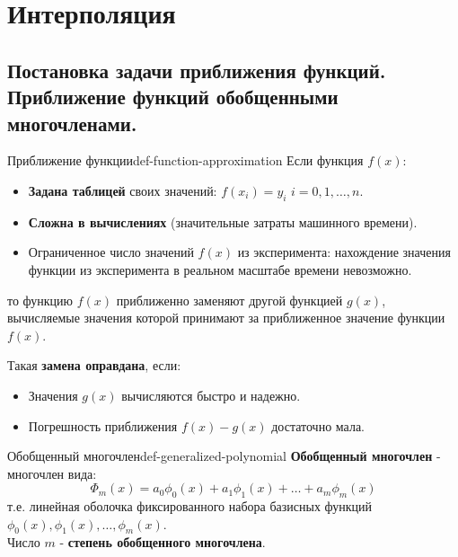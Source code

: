 \documentclass[14pt]{extarticle}
\begin{document}
\section{Интерполяция}

\subsection{Постановка задачи приближения функций. Приближение функций обобщенными многочленами.}

    \begin{definition}{Приближение функции}{def-function-approximation}
        Если функция $f(x)$:
        \begin{itemize}
            \item \textbf{Задана таблицей} своих значений: $f(x_{i}) = y_{i}$ $i = 0, 1, \ldots, n$.
            \item \textbf{Сложна в вычислениях} (значительные затраты машинного времени).
            \item Ограниченное число значений $f(x)$ из эксперимента: нахождение значения функции из эксперимента в реальном масштабе времени невозможно.
        \end{itemize}
        то функцию $f(x)$ приближенно заменяют другой функцией $g(x)$, вычисляемые значения которой принимают за приближенное значение функции $f(x)$.

        \vspace{\baselineskip}

        Такая \textbf{замена оправдана}, если:
        \begin{itemize}
            \item Значения $g(x)$ вычисляются быстро и надежно.
            \item Погрешность приближения $f(x) - g(x)$ достаточно мала.
        \end{itemize}
    \end{definition}

    \begin{definition}{Обобщенный многочлен}{def-generalized-polynomial}
        \textbf{Обобщенный многочлен} - многочлен вида:
        $$\Phi_{m}(x) = a_{0}\phi_{0}(x) + a_{1}\phi_{1}(x) + \ldots + a_{m}\phi_{m}(x)$$
        т.е. линейная оболочка фиксированного набора базисных функций $\phi_{0}(x), \phi_{1}(x), \ldots, \phi_{m}(x)$.\\
    
        Число $m$ - \textbf{степень обобщенного многочлена}.
    \end{definition}
\end{document}
